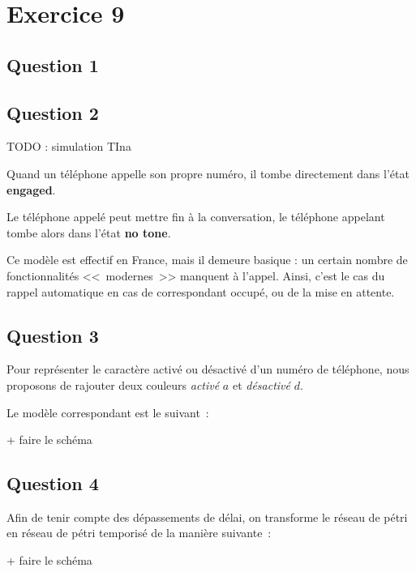 \section{Exercice 9}
\subsection{Question 1}
\subsection{Question 2}

TODO : simulation TIna

Quand un téléphone appelle son propre numéro, il tombe directement dans l'état \textbf{engaged}.

Le téléphone appelé peut mettre fin à la conversation, le téléphone
appelant tombe alors dans l'état \textbf{no tone}.

Ce modèle est effectif en France, mais il demeure basique : un certain
nombre de fonctionnalités <<~modernes~>> manquent à l'appel. Ainsi,
c'est le cas du rappel automatique en cas de correspondant occupé, ou
de la mise en attente.

\subsection{Question 3}

Pour représenter le caractère activé ou désactivé d'un numéro de
téléphone, nous proposons de rajouter deux couleurs \textit{activé}
$a$ et \textit{désactivé} $d$.

Le modèle correspondant est le suivant~:

+ faire le schéma
\subsection{Question 4}

Afin de tenir compte des dépassements de délai, on transforme le
réseau de pétri en réseau de pétri temporisé de la manière suivante~:

+ faire le schéma
